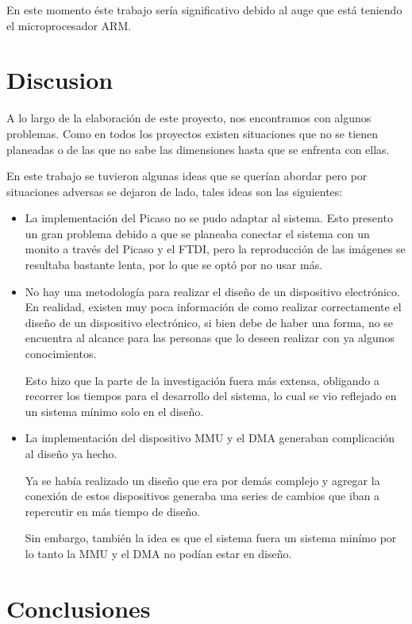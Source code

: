 En este momento éste trabajo sería significativo debido al auge que está teniendo el microprocesador ARM.

\section{Discusion}

A lo largo de la elaboración de este proyecto, nos encontramos con algunos problemas. Como en todos los proyectos existen situaciones que no se tienen planeadas o de las que no sabe las dimensiones hasta que se enfrenta con ellas. 

En este trabajo se tuvieron algunas ideas que se querían abordar pero por situaciones adversas se dejaron de lado, tales ideas son las siguientes:

\begin{itemize}
\item La implementación del Picaso no se pudo adaptar al sistema.
Esto presento un gran problema debido a que se planeaba conectar el sistema con un monito a través del Picaso y el FTDI, pero la reproducción de las imágenes se resultaba bastante lenta, por lo que se optó por no usar más.

\item No hay una metodología para realizar el diseño de un dispositivo electrónico.
En realidad, existen muy poca información de como realizar correctamente el diseño de un dispositivo electrónico, si bien debe de haber una forma, no se encuentra al alcance para las personas que lo deseen realizar con ya algunos conocimientos. 

Esto hizo que la parte de la investigación fuera más extensa, obligando a recorrer los tiempos para el desarrollo del sistema, lo cual se vio reflejado en un sistema mínimo solo en el diseño.

\item La implementación del dispositivo MMU y el DMA generaban complicación al diseño ya hecho.

Ya se había realizado un diseño que era por demás complejo y agregar la conexión de estos dispositivos generaba una series de cambios que iban a repercutir en más tiempo de diseño.

Sin embargo, también la idea es que el sistema fuera un sistema minímo por lo tanto la MMU y el DMA no podían estar en diseño.

\end{itemize}

\section{Conclusiones}

